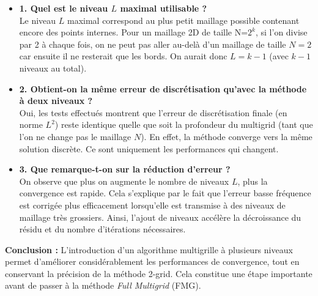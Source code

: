 \documentclass[12pt,a4paper]{article}
\begin{document}
\begin{itemize}
    \item \textbf{1. Quel est le niveau \(L\) maximal utilisable ?}\\
    Le niveau \(L\) maximal correspond au plus petit maillage possible contenant encore des points internes. Pour un maillage 2D de taille N=$2^k$, si l’on divise par 2 à chaque fois, on ne peut pas aller au-delà d’un maillage de taille \(N = 2\) car ensuite il ne resterait que les bords. On aurait donc \(L = k-1\) (avec \(k-1\) niveaux au total).

    \item \textbf{2. Obtient-on la même erreur de discrétisation qu’avec la méthode à deux niveaux ?}\\
    Oui, les tests effectués montrent que l'erreur de discrétisation finale (en norme $L^2$) reste identique quelle que soit la profondeur du multigrid (tant que l’on ne change pas le maillage \(N\)). En effet, la méthode converge vers la même solution discrète. Ce sont uniquement les performances qui changent.

    \item \textbf{3. Que remarque-t-on sur la réduction d’erreur ?}\\
    On observe que plus on augmente le nombre de niveaux \(L\), plus la convergence est rapide. Cela s’explique par le fait que l’erreur basse fréquence est corrigée plus efficacement lorsqu’elle est transmise à des niveaux de maillage très grossiers. Ainsi, l’ajout de niveaux accélère la décroissance du résidu et du nombre d’itérations nécessaires.
\end{itemize}

\textbf{Conclusion :} L’introduction d’un algorithme multigrille à plusieurs niveaux permet d’améliorer considérablement les performances de convergence, tout en conservant la précision de la méthode 2-grid. Cela constitue une étape importante avant de passer à la méthode \textit{Full Multigrid} (FMG).
\end{document}
